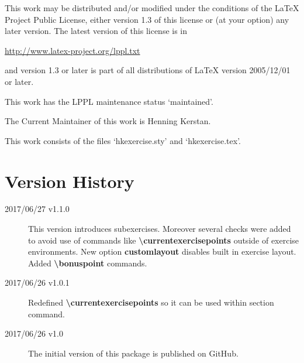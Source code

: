 \documentclass[
  twocolumn,%
  fontsize=9pt,%
  DIV=calc,%
  numbers=noendperiod%
]{scrartcl}
\begin{document}
\noindent This work may be distributed and/or modified under the conditions of the LaTeX Project Public License, either version 1.3 of this license or (at your option) any later version. The latest version of this license is in\medskip
 
   \url{http://www.latex-project.org/lppl.txt}\medskip
   
\noindent and version 1.3 or later is part of all distributions of LaTeX version 2005/12/01 or later.\medskip
 
 \noindent This work has the LPPL maintenance status `maintained'.\medskip
 
 \noindent The Current Maintainer of this work is Henning Kerstan.\medskip

 \noindent This work consists of the files `hkexercise.sty' and `hkexercise.tex'.


\section{Version History}
\begin{description}
\item[2017/06/27 v1.1.0] This version introduces subexercises. Moreover several checks were added to avoid use of commands like \textcolor{NavyBlue}{\ttfamily\bfseries\textbackslash currentexercisepoints} outside of exercise environments. New option \textcolor{NavyBlue}{\ttfamily\bfseries customlayout} disables built in exercise layout. Added \textcolor{NavyBlue}{\ttfamily\bfseries\textbackslash bonuspoint} commands.
\item[2017/06/26 v1.0.1] Redefined \textcolor{NavyBlue}{\ttfamily\bfseries\textbackslash currentexercisepoints} so it can be used within section command. 
\item[2017/06/26 v1.0] The initial version of this package is published on GitHub.
\end{description}
\end{document}
